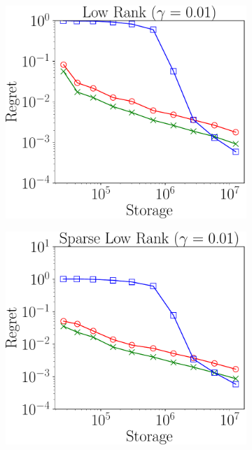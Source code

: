 \begin{figure}
	\centering
	\begin{subfigure}{0.3\textwidth}
		\includegraphics[scale = 0.24]{figure/fig1_lk_lnoise.pdf}
	\end{subfigure}
	\begin{subfigure}{0.3\textwidth}
		\includegraphics[scale = 0.24]{figure/fig1_slk_lnoise.pdf}
	\end{subfigure}

\end{figure}
